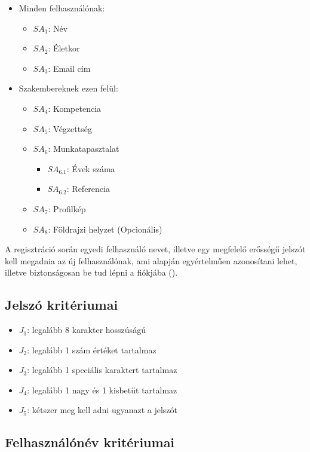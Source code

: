 \begin{itemize}
    \item Minden felhasználónak:
    \begin{itemize}
        \item ${SA}_1$: Név
        \item ${SA}_2$: Életkor
        \item ${SA}_3$: Email cím
    \end{itemize}
    \item Szakembereknek ezen felül:
    \begin{itemize}
        \item ${SA}_4$: Kompetencia
        \item ${SA}_5$: Végzettség
        \item ${SA}_6$: Munkatapasztalat
        \begin{itemize}
            \item ${SA}_{6.1}$: Évek száma
            \item ${SA}_{6.2}$: Referencia
        \end{itemize}
        \item  ${SA}_7$: Profilkép
        \item ${SA}_8$: Földrajzi helyzet (Opcionális)
    \end{itemize}
\end{itemize}

A regisztráció során egyedi felhasználó nevet, illetve egy megfelelő erősségű jelszót kell megadnia az új felhasználónak, ami alapján egyértelműen azonosítani lehet, illetve biztonságosan be tud lépni a fiókjába ().

\subsection{Jelszó kritériumai}

\begin{itemize}
    \item $J_1$: legalább 8 karakter hosszúságú
    \item $J_2$: legalább 1 szám értéket tartalmaz
    \item $J_3$: legalább 1 speciális karaktert tartalmaz
    \item $J_4$: legalább 1 nagy és 1 kisbetűt tartalmaz
    \item $J_5$: kétszer meg kell adni ugyanazt a jelszót
\end{itemize}

\subsection{Felhasználónév kritériumai}

